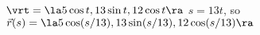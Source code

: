 {$\vrt = \la 5\cos t,13\sin t, 12\cos t\ra$
}
{$s = 13t$, so $\vec r(s)  = \la 5\cos (s/13), 13\sin (s/13), 12\cos (s/13)\ra$
}
